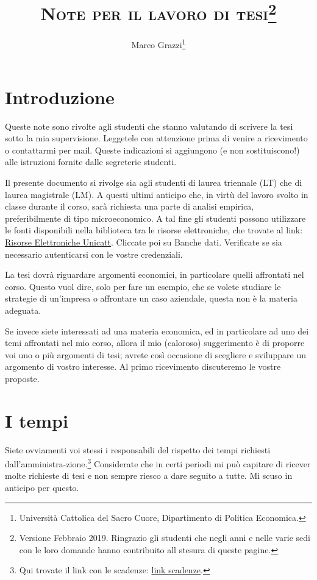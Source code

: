 \documentclass[12pt]{article}
\title{ \textsc{Note per il lavoro di tesi}\thanks{Versione Febbraio
    2019. Ringrazio gli studenti che negli anni e nelle varie sedi con
    le loro domande hanno contribuito all stesura di queste pagine.}}
\author{Marco Grazzi\thanks{Universit\`a Cattolica del Sacro Cuore, Dipartimento di Politica Economica.}}
\date{\empty}
\begin{document}
\maketitle





\section{Introduzione}

Queste note sono rivolte agli studenti che stanno valutando di
scrivere la tesi sotto la mia supervisione. Leggetele con attenzione
prima di venire a ricevimento o contattarmi per mail. Queste
indicazioni si aggiungono (e non sostituiscono!) alle istruzioni
fornite dalle segreterie studenti.

Il presente documento si rivolge sia agli studenti di laurea triennale
(LT) che di laurea magistrale (LM). A questi ultimi anticipo che, in
virt\`u del lavoro svolto in classe durante il corso, sar\`a richiesta
una parte di analisi empirica, preferibilmente di tipo
microeconomico. A tal fine gli studenti possono utilizzare le fonti
disponibili nella biblioteca tra le risorse elettroniche, che trovate
al link:
\href{https://biblioteche.unicatt.it/brescia-servizi-per-utenti-interni-ricerche-bibliografiche-e-banche-dati}{Risorse
  Elettroniche Unicatt}. Cliccate poi su Banche dati. Verificate se
sia necessario autenticarsi con le vostre credenziali.


La tesi dovr\`a riguardare argomenti economici, in particolare quelli
affrontati nel corso. Questo vuol dire, solo per fare un esempio, che
se volete studiare le strategie di un'impresa o affrontare un caso
aziendale, questa non \`e la materia adeguata.

Se invece siete interessati ad una materia economica, ed in
particolare ad uno dei temi affrontati nel mio corso, allora il mio
(caloroso) suggerimento \`e di proporre voi uno o pi\`u argomenti di
tesi; avrete cos\`i occasione di scegliere e sviluppare un argomento di
vostro interesse. Al primo ricevimento discuteremo le vostre proposte.



\section{I tempi}
Siete ovviamenti voi stessi i responsabili del rispetto dei tempi
richiesti dall'amministra-zione.\footnote{Qui trovate il link con le
  scadenze:
  \href{https://milano.unicatt.it/facolta/economia-informazioni-per-gli-studenti-esami-di-laurea-294}{link
    scadenze}. } Considerate che in certi periodi mi pu\`o capitare di
ricever molte richieste di tesi e non sempre riesco a dare seguito a
tutte. Mi scuso in anticipo per questo.
\end{document}
